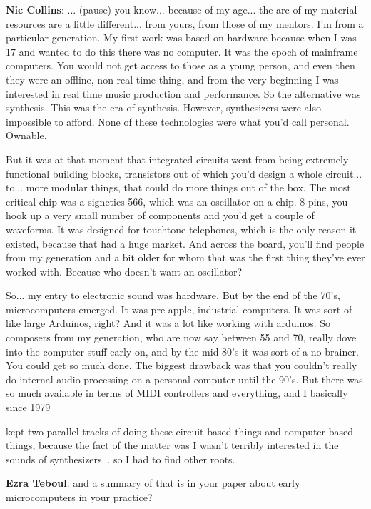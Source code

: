 \textbf{Nic Collins}: ... (pause) you know... because of my age... the arc of my material resources are a little different... from yours, from those of my mentors. I’m from a particular generation. My first work was based on hardware because when I was 17 and wanted to do this there was no computer. It was the epoch of mainframe computers. You would not get access to those as a young person, and even then they were an offline, non real time thing, and from the very beginning I was interested in real time music production and performance. So the alternative was synthesis. This was the era of synthesis. However, synthesizers were also impossible to afford. None of these technologies were what you’d call personal. Ownable.
					
But it was at that moment that integrated circuits went from being extremely functional building blocks, transistors out of which you’d design a whole circuit... to... more modular things, that could do more things out of the box. The most critical chip was a signetics 566, which was an oscillator on a chip. 8 pins, you hook up a very small number of components and you’d get a couple of waveforms. It was designed for touchtone telephones, which is the only reason it existed, because that had a huge market. And across the board, you’ll find people from my generation and a bit older for whom that was the first thing they’ve ever worked with. Because who doesn’t want an oscillator?
					
So... my entry to electronic sound was hardware. But by the end of the 70’s, microcomputers emerged. It was pre-apple, industrial computers. It was sort of like large Arduinos, right? And it was a lot like working with arduinos. So composers from my generation, who are now say between 55 and 70, really dove into the computer stuff early on, and by the mid 80’s it was sort of a no brainer. You could get so much done. The biggest drawback was that you couldn’t really do internal audio processing on a personal computer until the 90’s. But there was so much available in terms of MIDI controllers and everything, and I basically since 1979
					
kept two parallel tracks of doing these circuit based things and computer based things, because the fact of the matter was I wasn’t terribly interested in the sounds of synthesizers... so I had to find other roots.
					
\textbf{Ezra Teboul}: and a summary of that is in your paper about early microcomputers in your practice?
					
